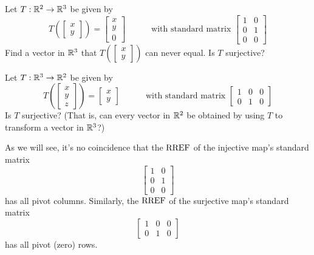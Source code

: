 \begin{applicationActivities}
\begin{activity}{3}
Let $T: \mathbb{R}^2 \rightarrow \mathbb{R}^3$ be given by
\[
  T\left(\begin{bmatrix}x \\ y \end{bmatrix} \right)
    =
  \begin{bmatrix} x \\ y \\ 0 \end{bmatrix}
    \hspace{3em}
    \text{with standard matrix }
  \begin{bmatrix} 1 & 0 \\ 0 & 1 \\ 0 & 0 \end{bmatrix}
\]
Find a vector in \(\mathbb{R}^3\) that
\(T\left(\begin{bmatrix}x \\ y \end{bmatrix} \right)\) can never equal.
Is $T$ surjective?
\end{activity}

\begin{activity}{2}
Let $T: \mathbb{R}^3 \rightarrow \mathbb{R}^2$ be given by
\[
  T\left(\begin{bmatrix}x \\ y\\z \end{bmatrix} \right)
    =
  \begin{bmatrix} x \\ y \end{bmatrix}
    \hspace{3em}
    \text{with standard matrix }
  \begin{bmatrix} 1 & 0 & 0 \\ 0 & 1 & 0 \end{bmatrix}
\]
Is $T$ surjective? (That is, can every vector in \(\mathbb{R}^2\) be obtained by
using \(T\) to transform a vector in \(\mathbb{R}^3\)?)
\end{activity}

\begin{observation}
As we will see, it's no coincidence that the \(\operatorname{RREF}\) of the
injective map's standard matrix
\[
  \begin{bmatrix} 1 & 0 \\ 0 & 1 \\ 0 & 0 \end{bmatrix}
\]
has all pivot columns. Similarly, the \(\operatorname{RREF}\) of the surjective map's
standard matrix
\[
  \begin{bmatrix} 1 & 0 & 0 \\ 0 & 1 & 0 \end{bmatrix}
\]
has all pivot (zero) rows.
\end{observation}



\end{applicationActivities}
